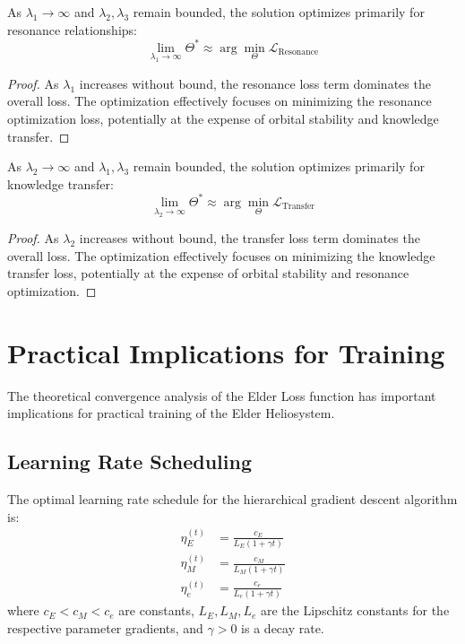 \begin{theorem}
As $\lambda_1 \to \infty$ and $\lambda_2, \lambda_3$ remain bounded, the solution optimizes primarily for resonance relationships:
\begin{equation}
\lim_{\lambda_1 \to \infty} \Theta^* \approx \arg\min_\Theta \mathcal{L}_{\text{Resonance}}
\end{equation}
\end{theorem}

\begin{proof}
As $\lambda_1$ increases without bound, the resonance loss term dominates the overall loss. The optimization effectively focuses on minimizing the resonance optimization loss, potentially at the expense of orbital stability and knowledge transfer.
\end{proof}

\begin{theorem}
As $\lambda_2 \to \infty$ and $\lambda_1, \lambda_3$ remain bounded, the solution optimizes primarily for knowledge transfer:
\begin{equation}
\lim_{\lambda_2 \to \infty} \Theta^* \approx \arg\min_\Theta \mathcal{L}_{\text{Transfer}}
\end{equation}
\end{theorem}

\begin{proof}
As $\lambda_2$ increases without bound, the transfer loss term dominates the overall loss. The optimization effectively focuses on minimizing the knowledge transfer loss, potentially at the expense of orbital stability and resonance optimization.
\end{proof}

\section{Practical Implications for Training}

The theoretical convergence analysis of the Elder Loss function has important implications for practical training of the Elder Heliosystem.

\subsection{Learning Rate Scheduling}

\begin{theorem}
The optimal learning rate schedule for the hierarchical gradient descent algorithm is:
\begin{align}
\eta_E^{(t)} &= \frac{c_E}{L_E(1 + \gamma t)} \\
\eta_M^{(t)} &= \frac{c_M}{L_M(1 + \gamma t)} \\
\eta_e^{(t)} &= \frac{c_e}{L_e(1 + \gamma t)}
\end{align}
where $c_E < c_M < c_e$ are constants, $L_E, L_M, L_e$ are the Lipschitz constants for the respective parameter gradients, and $\gamma > 0$ is a decay rate.
\end{theorem}

